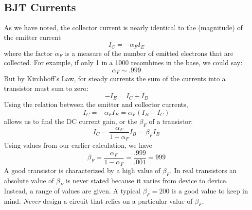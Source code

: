 \subsection{BJT Currents}
As we have noted, the collector current is nearly identical to the (magnitude) of the emitter current 
\begin{equation}
	{I_C} =  - {\alpha_F}{I_E}
\end{equation}
where the factor $\alpha_F$  is a measure of the number of emitted electrons that are collected.  For example, if only 1 in a 1000 recombines in the base, we could say:
\begin{equation}
	{\alpha _F} \sim .999
\end{equation}
But by Kirchhoff's Law, for steady currents the sum of the currents into a transistor must sum to zero:
\begin{equation} 
	- {I_E} = {I_C} + {I_B}
\end{equation}
Using the relation between the emitter and collector currents,
\begin{equation}
	{I_C} =  - {\alpha _F}{I_E} = {\alpha _F}({I_B} + {I_C})
\end{equation}
allows us to find the DC current gain, or the $\beta_F$ of a transistor:
\begin{equation}
	{I_C} = \frac{{{\alpha _F}}}{{1 - {\alpha _F}}}{I_B} = {\beta _F}{I_B}
\end{equation}
Using values from our earlier calculation, we have
\begin{equation}
	{\beta _F} = \frac{{{\alpha _F}}}{{1 - {\alpha _F}}} = \frac{{.999}}{{.001}} = 999
\end{equation}
A good transistor is characterized by a high value of $\beta_F$.  In real transistors an absolute value of $\beta_F$ is never stated because it varies from device to device.  Instead, a range of values are given.  A typical $\beta_F =200$ is a good value to keep in mind. \emph{Never} design a circuit that relies on a particular value of $\beta_F$.  

